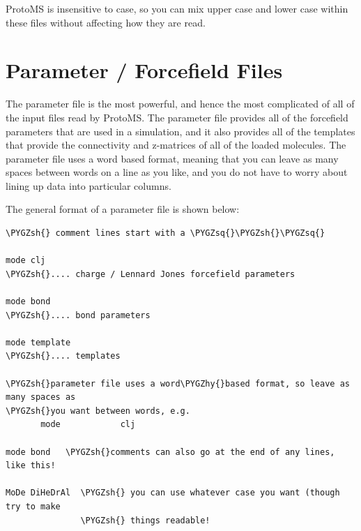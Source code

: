 \documentclass[letterpaper,10pt,english]{sphinxmanual}
\def\PYGZsh{\char`\#}
\def\PYGZhy{\char`\-}
\def\PYGZsq{\char`\'}
\begin{document}
ProtoMS is insensitive to case, so you can mix upper case and lower case within these files without affecting how
they are read.


\section{Parameter / Forcefield Files}
\label{protoms:parameter-forcefield-files}
The parameter file is the most powerful, and hence the most complicated of all of the input files read by ProtoMS. The parameter file provides all of the forcefield parameters that are used in a simulation, and it also provides all of the templates that provide the connectivity and z-matrices of all of the loaded molecules. The parameter file uses a word based format, meaning that you can leave as many spaces between words on a line as you like, and you do not have to worry about lining up data into particular columns.

The general format of a parameter file is shown below:

\begin{Verbatim}[commandchars=\\\{\}]
\PYGZsh{} comment lines start with a \PYGZsq{}\PYGZsh{}\PYGZsq{}

mode clj
\PYGZsh{}.... charge / Lennard Jones forcefield parameters

mode bond
\PYGZsh{}.... bond parameters

mode template
\PYGZsh{}.... templates

\PYGZsh{}parameter file uses a word\PYGZhy{}based format, so leave as many spaces as
\PYGZsh{}you want between words, e.g.
       mode            clj

mode bond   \PYGZsh{}comments can also go at the end of any lines, like this!

MoDe DiHeDrAl  \PYGZsh{} you can use whatever case you want (though try to make
               \PYGZsh{} things readable!
\end{Verbatim}
\end{document}
